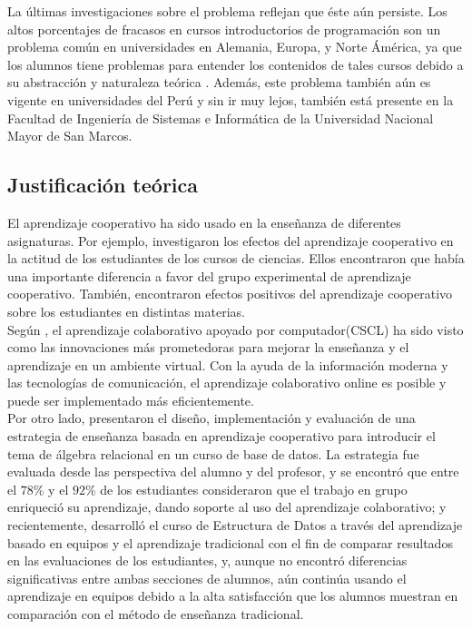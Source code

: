 La últimas investigaciones sobre el problema reflejan que éste aún persiste. Los altos porcentajes de fracasos en cursos introductorios de programación son un problema común en universidades en Alemania, Europa, y Norte Ámérica, ya que los alumnos tiene problemas para entender los contenidos de tales cursos debido a su abstracción y naturaleza teórica \cite{knobelsdorf_teaching_2014}. Además, este problema también aún es vigente en universidades del Perú y sin ir muy lejos, también está presente en la Facultad de Ingeniería de Sistemas e Informática de la Universidad Nacional Mayor de San Marcos.


\subsection{Justificación teórica}
El aprendizaje cooperativo ha sido usado en la enseñanza de diferentes asignaturas. Por ejemplo,  investigaron los efectos del aprendizaje cooperativo en la actitud de los estudiantes de los cursos de ciencias. Ellos encontraron que había una importante diferencia a favor del grupo experimental de aprendizaje cooperativo. También,  encontraron efectos positivos del aprendizaje cooperativo sobre los estudiantes en distintas materias.\\

Según , el aprendizaje colaborativo apoyado por computador(CSCL) ha sido visto como las innovaciones más prometedoras para mejorar la enseñanza y el aprendizaje en un ambiente virtual. Con la ayuda de la información moderna y las tecnologías de comunicación, el aprendizaje colaborativo online es posible y puede ser implementado más eficientemente.\\

Por otro lado,  presentaron el diseño, implementación y evaluación de una estrategia de enseñanza basada en aprendizaje cooperativo para introducir el tema de álgebra relacional en un curso de base de datos. La estrategia fue evaluada desde las perspectiva del alumno y del profesor, y se encontró que entre el $78\%$ y el $92\%$ de los estudiantes consideraron que el trabajo en grupo enriqueció su aprendizaje, dando soporte al uso del aprendizaje colaborativo; y recientemente,  desarrolló el curso de Estructura de Datos a través del aprendizaje basado en equipos y el aprendizaje tradicional con el fin de comparar resultados en las evaluaciones de los estudiantes, y, aunque no encontró diferencias significativas entre ambas secciones de alumnos, aún continúa usando el aprendizaje en equipos debido a la alta satisfacción que los alumnos muestran en comparación con el método de enseñanza tradicional.\\





